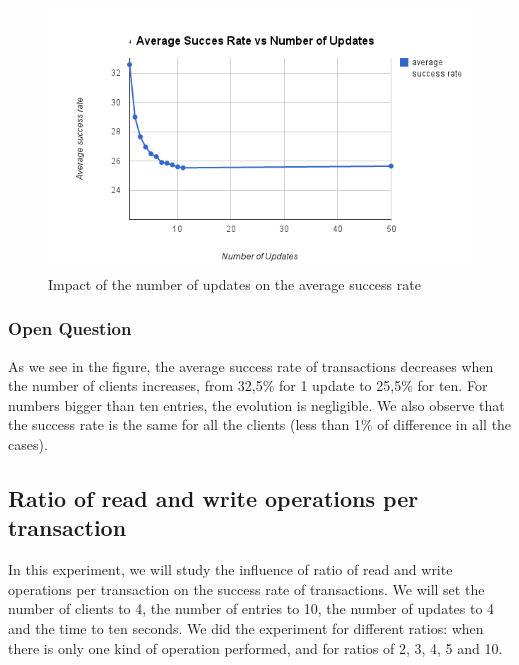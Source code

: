 \documentclass[a4paper, 11pt]{article}
\begin{document}
\begin{figure}[H]
\begin{center}
\includegraphics[scale=0.5]{exp3.png}
\caption{Impact of the number of updates on the average success rate}
\end{center}
\end{figure}

\subsubsection{Open Question}
As we see in the figure, the average success rate of transactions decreases when the number of clients increases, from 32,5\% for 1 update to 25,5\% for ten. For numbers bigger than ten entries, the evolution is negligible. We also observe that the success rate is the same for all the clients (less than 1\% of difference in all the cases).


\subsection{Ratio of read and write operations per transaction}
In this experiment, we will study the influence of ratio of read and write operations per transaction on the success rate of transactions. We will set the number of clients to 4, the number of entries to 10, the number of updates to 4 and the time to ten seconds. We did the experiment for different ratios: when there is only one kind of operation performed, and for ratios of 2, 3, 4, 5 and 10.
\end{document}
